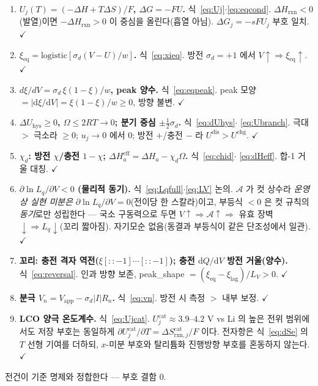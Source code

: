 \documentclass[11pt,a4paper]{article}
\newcommand{\dd}{\mathrm{d}}
\newcommand{\eff}{\mathrm{eff}}
\newcommand{\eq}{\mathrm{eq}}
\newcommand{\app}{\mathrm{app}}
\newcommand{\rxn}{\mathrm{rxn}}
\newcommand{\dis}{\mathrm{dis}}
\newcommand{\chg}{\mathrm{chg}}
\newcommand{\cat}{\mathrm{cat}}
\newcommand{\hys}{\mathrm{hys}}
\begin{document}
\begin{enumerate}[label=\textbf{S\arabic*.},leftmargin=2.6em,itemsep=2pt]
\item \textbf{$U_j(T)=(-\Delta H+T\Delta S)/F$, $\Delta G=-FU$.} 식~\eqref{eq:Uj}$\cdot$\eqref{eq:eqcond}. $\Delta H_\rxn<0$
(발열)이면 $-\Delta H_\rxn>0$ 이 중심을 올린다(흡열 아님). $\Delta G_j=-sFU_j$ 부호 일치. $\checkmark$
\item \textbf{$\xi_\eq=\mathrm{logistic}[\sigma_d(V-U)/w]$.} 식~\eqref{eq:xieq}. 방전 $\sigma_d=+1$ 에서
$V\!\uparrow\Rightarrow\xi_\eq\!\uparrow$. $\checkmark$
\item \textbf{$d\xi/dV=\sigma_d\,\xi(1-\xi)/w$, peak 양수.} 식~\eqref{eq:eqpeak}. peak 모양 $=|\dd\xi/\dd V|=
\xi(1-\xi)/w\ge0$, 방향 불변. $\checkmark$
\item \textbf{$\Delta U_\hys\ge0$, $\Omega\le2RT\to0$; 분기 중심 $\pm\tfrac12\sigma_d$.} 식~\eqref{eq:dUhys}$\cdot$
\eqref{eq:Ubranch}. 극대 $>$ 극소라 $\ge0$; $u_j\to0$ 에서 $0$; 방전 $+$/충전 $-$ 라 $U^{\dis}>U^{\chg}$. $\checkmark$
\item \textbf{$\chi_d$: 방전 $\chi$/충전 $1-\chi$; $\Delta H_a^\eff=\Delta H_a-\chi_d\Omega$.} 식~\eqref{eq:chid}$\cdot$
\eqref{eq:dHeff}. 합-1 거울 대칭. $\checkmark$
\item \textbf{$\partial\ln L_q/\partial V<0$ (물리적 동기).} 식~\eqref{eq:Lqfull}$\cdot$\eqref{eq:LV} 논의. $\mathcal A$ 가
컷 상수라 \emph{운영상 실현 미분은} $\partial\ln L_q/\partial V=0$(전이당 한 스칼라)이고, 부등식 $<0$ 은 컷 규칙의
\emph{동기}로만 성립한다 — 국소 구동력으로 두면 $V\!\uparrow\Rightarrow\mathcal A\!\uparrow\Rightarrow$ 유효 장벽
$\downarrow\Rightarrow L_q\downarrow$(꼬리 짧아짐). 자기모순 없음(동결과 부등식이 같은 단조성에서 일관). $\checkmark$
\item \textbf{꼬리: 충전 격자 역전($\xi[::-1]\cdots[::-1]$); 충전 $\dd Q/\dd V$ 방전 거울(양수).} 식~\eqref{eq:reversal}.
인과 방향 보존, peak\_shape $=(\xi_\eq-\xi_\mathrm{lag})/L_V>0$. $\checkmark$
\item \textbf{분극 $V_n=V_\app-\sigma_d|I|R_n$.} 식~\eqref{eq:vn}. 방전 시 측정 $>$ 내부 보정. $\checkmark$
\item \textbf{LCO 양극 온도계수.} 식~\eqref{eq:Ujcat}. $U_j^\cat\approx3.9$--$4.2$ V vs Li 의 높은 전위
범위에서도 저장 부호는 동일하게 $\partial U_j^\cat/\partial T=\Delta S_{\rxn,j}^\cat/F$ 이다. 전자항은
식~\eqref{eq:dSe} 의 $T$ 선형 기여를 더하되, $x$-미분 부호와 탈리튬화 진행방향 부호를 혼동하지 않는다. $\checkmark$
\end{enumerate}
전건이 기준 명제와 정합한다 — 부호 결함 $0$.
\end{document}
